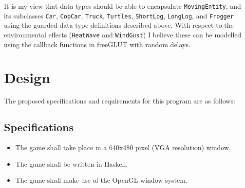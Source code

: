 \documentclass[12pt, a4paper]{report}
\begin{document}
It is my view that data types should be able to encapsulate \verb|MovingEntity|, and its subclasses \verb|Car|, \verb|CopCar|, \verb|Truck|, \verb|Turtles|, \verb|ShortLog|, \verb|LongLog|, and \verb|Frogger| using the guarded data type definitions described above.
With respect to the environmental effects (\verb|HeatWave| and \verb|WindGust|) I believe these can be modelled using the callback functions in freeGLUT with random delays.

\section{Design}
The proposed specifications and requirements for this program are as follows:

\subsection{Specifications}
\begin{itemize}
  \item The game shall take place in a 640x480 pixel (VGA resolution) window.
  \item The game shall be written in Haskell.
  \item The game shall make use of the OpenGL window system.
\end{itemize}
\end{document}
